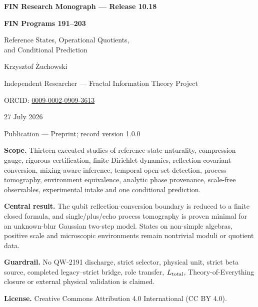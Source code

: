 \documentclass[11pt,a4paper,openany]{report}
\begin{document}
\hypersetup{pageanchor=false}
\begin{titlepage}
\centering
\vspace*{8mm}
{\Large\bfseries FIN Research Monograph --- Release 10.18\par}
\vspace{10mm}
{\Huge\bfseries FIN Programs 191--203\par}
\vspace{6mm}
{\Large Reference States, Operational Quotients,\\
and Conditional Prediction\par}
\vspace{16mm}
{\Large Krzysztof \.Zuchowski\par}
\vspace{2mm}
{\normalsize Independent Researcher --- Fractal Information Theory Project\par}
\vspace{2mm}
{\normalsize ORCID: \href{https://orcid.org/0009-0002-0909-3613}{0009-0002-0909-3613}\par}
\vspace{10mm}
{\large 27 July 2026\par}
{\normalsize Publication --- Preprint; record version 1.0.0\par}
\vfill
\begin{minipage}{0.88\textwidth}
\small
\textbf{Scope.} Thirteen executed studies of reference-state naturality,
compression gauge, rigorous certification, finite Dirichlet dynamics,
reflection-covariant conversion, mixing-aware inference, temporal open-set
detection, process tomography, environment equivalence, analytic phase
provenance, scale-free observables, experimental intake and one conditional
prediction.

\medskip
\textbf{Central result.} The qubit reflection-conversion boundary is reduced
to a finite closed formula, and single/plus/echo process tomography is proven
minimal for an unknown-blur Gaussian two-step model. States on non-simple
algebras, positive scale and microscopic environments remain nontrivial
moduli or quotient data.

\medskip
\textbf{Guardrail.} No QW-2191 discharge, strict selector, physical unit,
strict beta source, completed legacy--strict bridge, role transfer,
\(L_{\rm total}\), Theory-of-Everything closure or external physical
validation is claimed.

\medskip
\textbf{License.} Creative Commons Attribution 4.0 International (CC BY 4.0).
\end{minipage}
\vfill
\end{titlepage}
\hypersetup{pageanchor=true}
\end{document}
